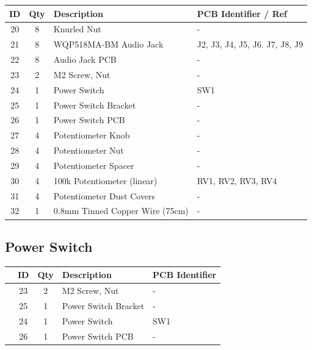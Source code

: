 \documentclass[12pt, a4paper]{article}
\newcommand{\checkbox}[1]{\CheckBox[backgroundcolor=0.86 0.828 0.71, name=#1]{}}
\begin{document}
\begin{center}
    \small
    \setlength\extrarowheight{4pt}
    \begin{tabularx}{\textwidth}{|c|c|X|l|}
        \hline \rowcolor{lightgray} ID & Qty & Description & PCB Identifier / Ref\\
        \hline 20 & 8 & Knurled Nut & -\\
        \hline 21 & 8 & WQP518MA-BM Audio Jack & J2, J3, J4, J5, J6. J7, J8, J9\\
        \hline 22 & 8 & Audio Jack PCB & -\\
        \hline 23 & 2 & M2 Screw, Nut & -\\
        \hline 24 & 1 & Power Switch & SW1\\
        \hline 25 & 1 & Power Switch Bracket & -\\
        \hline 26 & 1 & Power Switch PCB & -\\
        \hline 27 & 4 & Potentiometer Knob & -\\
        \hline 28 & 4 & Potentiometer Nut & -\\
        \hline 29 & 4 & Potentiometer Spacer & -\\
        \hline 30 & 4 & 100k Potentiometer (linear) & RV1, RV2, RV3, RV4\\
        \hline 31 & 4 & Potentiometer Dust Covers & -\\
        \hline 32 & 1 & 0.8mm Tinned Copper Wire (75cm) & -\\
        \hline
    \end{tabularx}
\end{center}

\pagebreak
\subsection{Power Switch}

\begin{center}
    \small
    \setlength\extrarowheight{8pt}
    \begin{tabularx}{\textwidth}{|c|c|c|X|l|}
        \hline\rowcolor{lightgray} & ID & Qty & Description & PCB Identifier\\
        \hline\checkbox{ha} & 23 & 2 & M2 Screw, Nut & -\\
        \hline\checkbox{hb} & 25 & 1 & Power Switch Bracket & -\\
        \hline\checkbox{hc} & 24 & 1 & Power Switch & SW1\\
        \hline\checkbox{hd} & 26 & 1 & Power Switch PCB & -\\
        \hline
    \end{tabularx}
\end{center}
\end{document}
